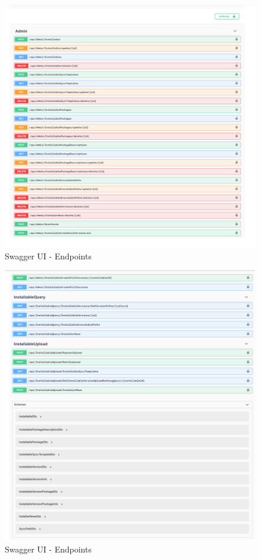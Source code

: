 \begin{figure}[p]
    \centering
    \includegraphics[width=.94\textwidth]{pics/swagger01.PNG}
    \caption{Swagger UI - Endpoints}
\end{figure}
\clearpage
\begin{figure}[p]
    \centering
    \includegraphics[width=.94\textwidth]{pics/swagger02.PNG}
    \caption{Swagger UI - Endpoints}
\end{figure}

